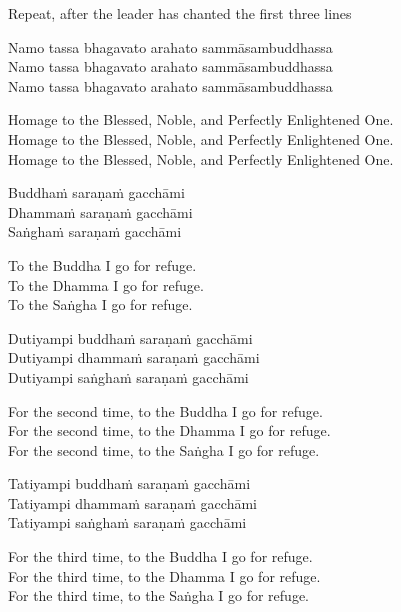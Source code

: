 \begin{instruction}
  Repeat, after the leader has chanted the first three lines
\end{instruction}

Namo tassa bhagavato arahato sammāsambuddhassa\\
Namo tassa bhagavato arahato sammāsambuddhassa\\
Namo tassa bhagavato arahato sammāsambuddhassa

\begin{english}
  Homage to the Blessed, Noble, and Perfectly Enlightened One.\\
  Homage to the Blessed, Noble, and Perfectly Enlightened One.\\
  Homage to the Blessed, Noble, and Perfectly Enlightened One.
\end{english}

Buddhaṁ saraṇaṁ gacchāmi\\
Dhammaṁ saraṇaṁ gacchāmi\\
Saṅghaṁ saraṇaṁ gacchāmi

\begin{english}
  To the Buddha I go for refuge.\\
  To the Dhamma I go for refuge.\\
  To the Saṅgha I go for refuge.
\end{english}

Dutiyampi buddhaṁ saraṇaṁ gacchāmi\\
Dutiyampi dhammaṁ saraṇaṁ gacchāmi\\
Dutiyampi saṅghaṁ saraṇaṁ gacchāmi

\begin{english}
  For the second time, to the Buddha I go for refuge.\\
  For the second time, to the Dhamma I go for refuge.\\
  For the second time, to the Saṅgha I go for refuge.
\end{english}

Tatiyampi buddhaṁ saraṇaṁ gacchāmi\\
Tatiyampi dhammaṁ saraṇaṁ gacchāmi\\
Tatiyampi saṅghaṁ saraṇaṁ gacchāmi

\clearpage

\begin{english}
  For the third time, to the Buddha I go for refuge.\\
  For the third time, to the Dhamma I go for refuge.\\
  For the third time, to the Saṅgha I go for refuge.
\end{english}

